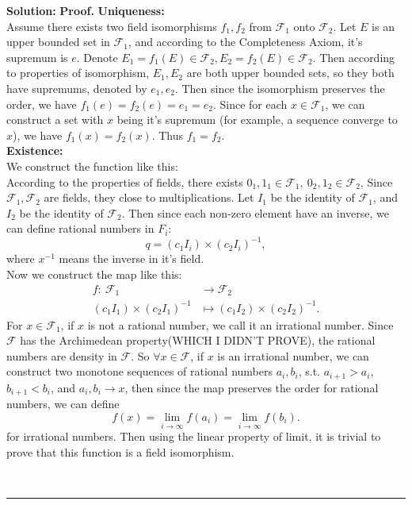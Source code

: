 \documentclass{article}%
\newenvironment{proof}[1][Proof]{\textbf{#1.} }{\ \rule{0.5em}{0.5em}}
\begin{document}
\begin{enumerate}
\textbf{Solution:} 
\begin{proof}
\textbf{Uniqueness:} \\
Assume there exists two field isomorphisms $f_1, f_2$ from $\mathcal{F}_1$ onto $\mathcal{F}_2$. Let $E$ is an upper bounded set in $\mathcal{F}_1$, and according to the Completeness Axiom, it's supremum is $e$. Denote $E_1 = f_1(E)\in \mathcal{F}_2, E_2 = f_2(E)\in\mathcal{F}_2$. Then according to properties of isomorphism, $E_1, E_2$ are both upper bounded sets, so they both have supremums, denoted by $e_1, e_2$. Then since the isomorphism preserves the order, we have $f_1(e) = f_2(e) = e_1 = e_2$. Since for each $x\in \mathcal{F}_1$, we can construct a set with $x$ being it's supremum (for example, a sequence converge to $x$), we have $f_1(x) = f_2(x)$. Thus $f_1 = f_2$. \\[5pt]
\textbf{Existence:} \\
We construct the function like this: \\
According to the properties of fields, there exists $0_1, 1_1\in \mathcal{F}_1,~ 0_2, 1_2\in \mathcal{F}_2$, 
Since $\mathcal{F}_1, \mathcal{F}_2$ are fields, they close to multiplications. Let $I_1$ be the identity of $\mathcal{F}_1$, and $I_2$ be the identity of $\mathcal{F}_2$. Then since each non-zero element have an inverse, we can define rational numbers in $F_i$:
$$
q = (c_1I_i)\times (c_2I_i)^{-1},
$$
where $x^{-1}$ means the inverse in it's field. \\
Now we construct the map like this: \\
$$
\begin{aligned}
f: ~\mathcal{F}_1&\to\mathcal{F}_2 \\
(c_1I_1)\times(c_2I_1)^{-1} &\mapsto (c_1I_2)\times(c_2I_2)^{-1}.
\end{aligned}
$$
For $x \in \mathcal{F}_1$, if $x$ is not a rational number, we call it an irrational number. Since $\mathcal{F}$ has the Archimedean property(WHICH I DIDN'T PROVE), the rational numbers are density in $\mathcal{F}$. So $\forall x\in \mathcal{F}$, if $x$ is an irrational number, we can construct two monotone sequences of rational numbers ${a_i}, {b_i}$, s.t. $a_{i+1}>a_{i}$, $b_{i+1} < b_{i}$, and ${a_i}, {b_i} \to x$, then since the map preserves the order for rational numbers, we can define 
$$
f(x) = \lim_{i\to\infty}f(a_i) = \lim_{i\to\infty}f(b_i).
$$
for irrational numbers. Then using the linear property of limit, it is trivial to prove that this function is a field isomorphism.




\end{proof}
\bigskip


\end{enumerate}
\end{document}
